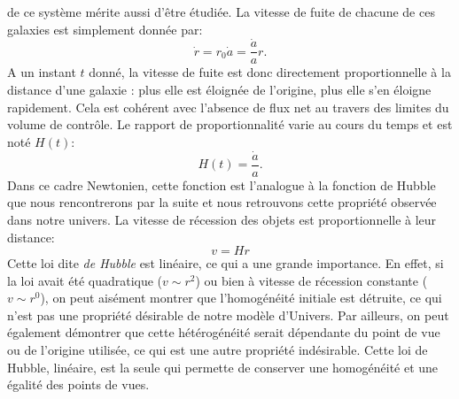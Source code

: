  de ce système mérite aussi d'être étudiée. La vitesse de fuite de chacune de ces galaxies est simplement donnée par:
\begin{equation}
\dot r= r_0 \dot a = \frac{\dot a}{a} r.
\end{equation}
A un instant $t$ donné, la vitesse de fuite est donc directement proportionnelle à la distance d'une galaxie : plus elle est éloignée de l'origine, plus elle s'en éloigne rapidement. Cela est cohérent avec l'absence de flux net au travers des limites du volume de contrôle. Le rapport de proportionnalité varie au cours du temps et est noté $H(t)$:
\begin{equation}
H(t)=\frac{\dot a}{a}.
\end{equation}
Dans ce cadre Newtonien, cette fonction est l'analogue à la fonction de Hubble  que nous rencontrerons par la suite et nous retrouvons cette propriété observée dans notre univers. La vitesse de récession des objets est proportionnelle à leur distance:
\begin{equation}
v=Hr
\label{e:hubblenewt}
\end{equation}
Cette loi dite \textit{de Hubble} est linéaire, ce qui a une grande importance. En effet, si la loi avait été quadratique ($v\sim r^2$) ou bien à vitesse de récession constante ($v\sim r^0$), on peut aisément montrer que l'homogénéité initiale est détruite, ce qui n'est pas une propriété désirable de notre modèle d'Univers. Par ailleurs, on peut également démontrer que cette hétérogénéité serait dépendante du point de vue ou de l'origine utilisée, ce qui est une autre propriété indésirable. Cette loi de Hubble, linéaire, est la seule qui permette de conserver une homogénéité et une égalité des points de vues.

